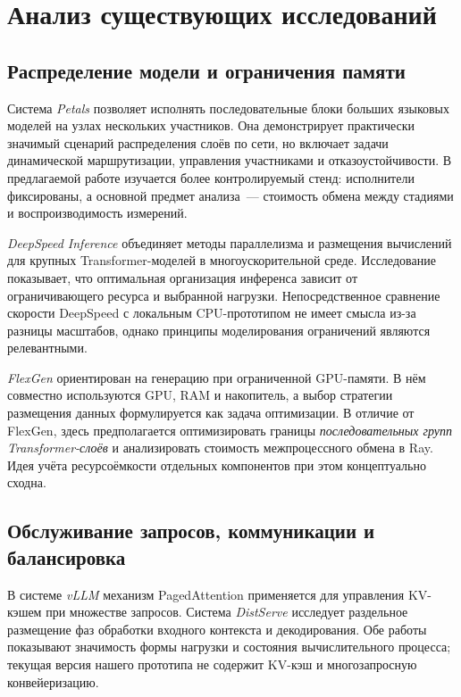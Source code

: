 \section{Анализ существующих исследований}

\subsection{Распределение модели и ограничения памяти}

Система \emph{Petals} \cite{petals2023} позволяет исполнять последовательные блоки больших языковых моделей на узлах нескольких участников. Она демонстрирует практически значимый сценарий распределения слоёв по сети, но включает задачи динамической маршрутизации, управления участниками и отказоустойчивости. В предлагаемой работе изучается более контролируемый стенд: исполнители фиксированы, а основной предмет анализа~--- стоимость обмена между стадиями и воспроизводимость измерений.

\emph{DeepSpeed Inference} \cite{deepspeed2022} объединяет методы параллелизма и размещения вычислений для крупных Transformer-моделей в многоускорительной среде. Исследование показывает, что оптимальная организация инференса зависит от ограничивающего ресурса и выбранной нагрузки. Непосредственное сравнение скорости DeepSpeed с локальным CPU-прототипом не имеет смысла из-за разницы масштабов, однако принципы моделирования ограничений являются релевантными.

\emph{FlexGen} \cite{flexgen2023} ориентирован на генерацию при ограниченной GPU-памяти. В нём совместно используются GPU, RAM и накопитель, а выбор стратегии размещения данных формулируется как задача оптимизации. В отличие от FlexGen, здесь предполагается оптимизировать границы \emph{последовательных групп Transformer-слоёв} и анализировать стоимость межпроцессного обмена в Ray. Идея учёта ресурсоёмкости отдельных компонентов при этом концептуально сходна.

\subsection{Обслуживание запросов, коммуникации и балансировка}

В системе \emph{vLLM} \cite{vllm2023} механизм PagedAttention применяется для управления KV-кэшем при множестве запросов. Система \emph{DistServe} \cite{distserve2024} исследует раздельное размещение фаз обработки входного контекста и декодирования. Обе работы показывают значимость формы нагрузки и состояния вычислительного процесса; текущая версия нашего прототипа не содержит KV-кэш и многозапросную конвейеризацию.

